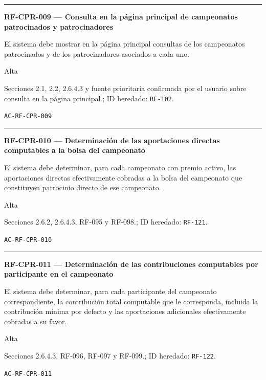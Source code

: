 \documentclass[10pt,letterpaper]{article}
\begin{document}
\vspace{0.25em}\hrule\vspace{0.65em}
\noindent\textbf{RF-CPR-009 --- Consulta en la página principal de campeonatos patrocinados y patrocinadores}\par
\begin{description}[style=nextline,leftmargin=3.15cm,labelwidth=2.8cm,font=\normalfont\bfseries]
\item[Obligación] El sistema debe mostrar en la página principal consultas de los campeonatos patrocinados y de los patrocinadores asociados a cada uno.
\item[Prioridad] Alta
\item[Procedencia] Secciones 2.1, 2.2, 2.6.4.3 y fuente prioritaria confirmada por el usuario sobre consulta en la página principal.; ID heredado: \texttt{RF-102}.
\item[Verificación] \texttt{AC-RF-CPR-009}
\end{description}
\vspace{0.25em}\hrule\vspace{0.65em}
\noindent\textbf{RF-CPR-010 --- Determinación de las aportaciones directas computables a la bolsa del campeonato}\par
\begin{description}[style=nextline,leftmargin=3.15cm,labelwidth=2.8cm,font=\normalfont\bfseries]
\item[Obligación] El sistema debe determinar, para cada campeonato con premio activo, las aportaciones directas efectivamente cobradas a la bolsa del campeonato que constituyen patrocinio directo de ese campeonato.
\item[Prioridad] Alta
\item[Procedencia] Secciones 2.6.2, 2.6.4.3, RF-095 y RF-098.; ID heredado: \texttt{RF-121}.
\item[Verificación] \texttt{AC-RF-CPR-010}
\end{description}
\vspace{0.25em}\hrule\vspace{0.65em}
\noindent\textbf{RF-CPR-011 --- Determinación de las contribuciones computables por participante en el campeonato}\par
\begin{description}[style=nextline,leftmargin=3.15cm,labelwidth=2.8cm,font=\normalfont\bfseries]
\item[Obligación] El sistema debe determinar, para cada participante del campeonato correspondiente, la contribución total computable que le corresponda, incluida la contribución mínima por defecto y las aportaciones adicionales efectivamente cobradas a su favor.
\item[Prioridad] Alta
\item[Procedencia] Secciones 2.6.4.3, RF-096, RF-097 y RF-099.; ID heredado: \texttt{RF-122}.
\item[Verificación] \texttt{AC-RF-CPR-011}
\end{description}
\end{document}
